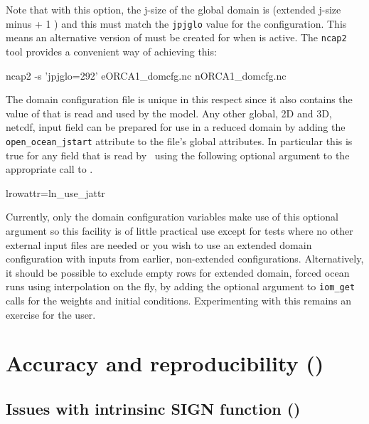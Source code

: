 \documentclass[../main/NEMO_manual]{subfiles}
\begin{document}
\noindent Note that with this option, the j-size of the global domain is (extended
j-size minus  + 1 ) and this must match the \texttt{jpjglo} value
for the configuration. This means an alternative version of  must
be created for when  is active. The \texttt{ncap2} tool provides a
convenient way of achieving this:

\begin{cmds}
ncap2 -s 'jpjglo=292' eORCA1_domcfg.nc nORCA1_domcfg.nc
\end{cmds}

The domain configuration file is unique in this respect since it also contains the value of 
that is read and used by the model.
Any other global, 2D and 3D, netcdf, input field can be prepared for use in a reduced domain by adding the
\texttt{open\_ocean\_jstart} attribute to the file's global attributes.
In particular this is true for any field that is read by \NEMO\ using the following optional argument to
the appropriate call to .

\begin{forlines}
lrowattr=ln_use_jattr
\end{forlines}

Currently, only the domain configuration variables make use of this optional argument so
this facility is of little practical use except for tests where no other external input
files are needed or you wish to use an extended domain configuration with inputs from
earlier, non-extended configurations. Alternatively, it should be possible to exclude
empty rows for extended domain, forced ocean runs using interpolation on the fly, by
adding the optional argument to \texttt{iom\_get} calls for the weights and initial
conditions. Experimenting with this remains an exercise for the user.

\section[Accuracy and reproducibility (\textit{lib\_fortran.F90})]{Accuracy and reproducibility (\protect{})}
\label{sec:MISC_fortran}

\subsection[Issues with intrinsinc SIGN function (\texttt{\textbf{key\_nosignedzero}})]{Issues with intrinsinc SIGN function (\protect{})}
\label{subsec:MISC_sign}
\end{document}
